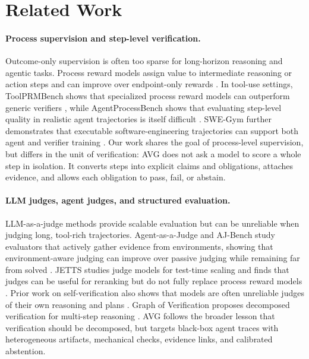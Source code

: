 \documentclass{article} %
\newcommand{\AVG}{\textsc{AVG}\xspace}
\begin{document}
\section{Related Work}
\label{sec:related}

\paragraph{Process supervision and step-level verification.}
Outcome-only supervision is often too sparse for long-horizon reasoning and agentic tasks. Process reward models assign value to intermediate reasoning or action steps and can improve over endpoint-only rewards \citep{setlur2025rewardingprogress,yuan2026vpr,wang2025sparl,choudhury2025agentprm,xi2025agentprm}. In tool-use settings, ToolPRMBench shows that specialized process reward models can outperform generic verifiers \citep{li2026toolprmbench}, while AgentProcessBench shows that evaluating step-level quality in realistic agent trajectories is itself difficult \citep{fan2026agentprocessbench}. SWE-Gym further demonstrates that executable software-engineering trajectories can support both agent and verifier training \citep{pan2024swegym}. Our work shares the goal of process-level supervision, but differs in the unit of verification: \AVG does not ask a model to score a whole step in isolation. It converts steps into explicit claims and obligations, attaches evidence, and allows each obligation to pass, fail, or abstain.

\paragraph{LLM judges, agent judges, and structured evaluation.}
LLM-as-a-judge methods provide scalable evaluation but can be unreliable when judging long, tool-rich trajectories. Agent-as-a-Judge and AJ-Bench study evaluators that actively gather evidence from environments, showing that environment-aware judging can improve over passive judging while remaining far from solved \citep{zhuge2025agentasjudge,shi2026ajbench}. JETTS studies judge models for test-time scaling and finds that judges can be useful for reranking but do not fully replace process reward models \citep{zhou2025jetts}. Prior work on self-verification also shows that models are often unreliable judges of their own reasoning and plans \citep{stechly2025selfverification}. Graph of Verification proposes decomposed verification for multi-step reasoning \citep{fang2025graphofverification}. \AVG follows the broader lesson that verification should be decomposed, but targets black-box agent traces with heterogeneous artifacts, mechanical checks, evidence links, and calibrated abstention.
\end{document}
